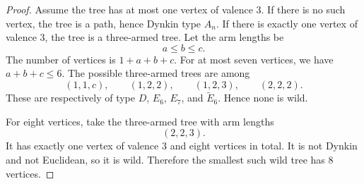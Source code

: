 \documentclass[11pt, a4paper]{article}
\begin{document}
\begin{enumerate}[leftmargin=*, label=\textbf{\arabic*.}]
\begin{proof}
Assume the tree has at most one vertex of valence $3$. If there is no such vertex, the tree is a path, hence Dynkin type $A_n$.
If there is exactly one vertex of valence $3$, the tree is a three-armed tree. Let the arm lengths be
\[
a\le b\le c.
\]
The number of vertices is $1+a+b+c$.
For at most seven vertices, we have $a+b+c\le6$. The possible three-armed trees are among
\[
(1,1,c),\qquad (1,2,2),\qquad (1,2,3),\qquad (2,2,2).
\]
These are respectively of type $D$, $E_6$, $E_7$, and $\widetilde E_6$. Hence none is wild.

For eight vertices, take the three-armed tree with arm lengths
\[
(2,2,3).
\]
It has exactly one vertex of valence $3$ and eight vertices in total. It is not Dynkin and not Euclidean, so it is wild. Therefore the smallest such wild tree has $8$ vertices.
\end{proof}

\end{enumerate}
\end{document}
